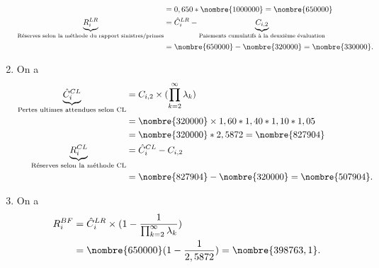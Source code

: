 \begin{exercice}
\begin{sol}
\begin{enumerate}
\begin{align*}
                                                                                 &= 0,650 * \nombre{1000000} = \nombre{650000} \\
        \underbrace{R_i^{LR}}_{\text{Réserves selon la méthode du rapport sinistres/primes}}
                                                                                 &= \hat{C}_{i}^{LR} - \underbrace{C_{i, 2}}_{\text{Paiements cumulatifs à la deuxième évaluation}} \\
                                                                                 &= \nombre{650000} - \nombre{320000} = \nombre{330000}.
      \end{align*}

    \item On a
      \begin{align*}
        \underbrace{\hat{C}_{i}^{CL}}_{\text{Pertes ultimes attendues selon CL}} &=
                                                                                   C_{i, 2} \times (\prod_{k=2}^{\infty} \lambda_k)\\
                                                                                 &= \nombre{320000} \times  1,60 * 1,40 * 1,10 * 1,05 \\
                                                                                 &= \nombre{320000} * 2,5872 = \nombre{827904}\\
        \underbrace{R_i^{CL}}_{\text{Réserves selon la méthode CL}}
                                                                                 &= \hat{C}_{i}^{CL} - C_{i, 2} \\
                                                                                 &= \nombre{827904} - \nombre{320000} = \nombre{507904}.
      \end{align*}

    \item On a
      \begin{align*}
        R_i^{BF} &= \hat{C}_{i}^{LR} \times ( 1 - \frac{1}{\prod_{k=2}^{\infty} \lambda_k}) \\
                 &= \nombre{650000} (1-\frac{1}{2,5872}) = \nombre{398763,1}.
      \end{align*}
    \end{enumerate}
  \end{sol}
\end{exercice}

